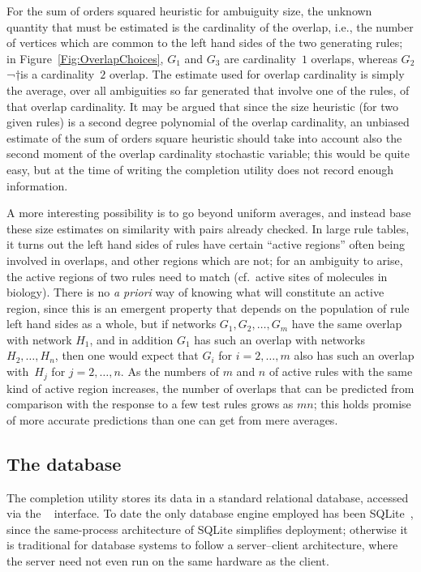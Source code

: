 \documentclass{article}
\theoremstyle{definition}
\begin{document}
For the sum of orders squared heuristic for ambuiguity size, the 
unknown quantity that must be estimated is the cardinality of the 
overlap, i.e., the number of vertices which are common to the left 
hand sides of the two generating rules; in 
Figure~\ref{Fig:OverlapChoices}, $G_1$ and $G_3$ are cardinality~$1$ 
overlaps, whereas $G_2$¬†is a cardinality~$2$ overlap. The estimate 
used for overlap cardinality is simply the average, over all 
ambiguities so far generated that involve one of the rules, of that 
overlap cardinality. It may be argued that since the size heuristic 
(for two given rules) is a second degree polynomial of the overlap 
cardinality, an unbiased estimate of the sum of orders square 
heuristic should take into account also the second moment of the 
overlap cardinality stochastic variable; this would be quite easy, 
but at the time of writing the completion utility does not record 
enough information.

A more interesting possibility is to go beyond uniform averages, and 
instead base these size estimates on similarity with pairs already 
checked. In large rule tables, it turns out the left hand sides of 
rules have certain ``active regions'' often being involved in overlaps, 
and other regions which are not; for an ambiguity to arise, the 
active regions of two rules need to match (cf.~active sites of 
molecules in biology). There is no \emph{a priori} way of knowing 
what will constitute an active region, since this is an emergent 
property that depends on the population of rule left hand sides as a 
whole, but if networks $G_1,G_2,\dotsc,G_m$ have the same overlap with 
network $H_1$, and in addition $G_1$ has such an overlap with 
networks~$H_2,\dotsc,H_n$, then one would expect that $G_i$ for 
\(i=2,\dotsc,m\) also has such an overlap with~$H_j$ for 
\(j=2,\dotsc,n\). As the numbers of $m$ and $n$ of active rules with 
the same kind of active region increases, the number of overlaps 
that can be predicted from comparison with the response to a few 
test rules grows as $mn$; this holds promise of more accurate 
predictions than one can get from mere averages.



\subsection{The database}
\label{Ssec:Database}

The completion utility stores its data in a standard relational 
database, accessed via the ~\cite{TDBC} interface. To 
date the only database engine employed has been SQLite~\cite{SQLite}, 
since the same-process architecture of SQLite simplifies deployment; 
otherwise it is traditional for database systems to follow a 
server--client architecture, where the server need not even run on 
the same hardware as the client.
\end{document}
